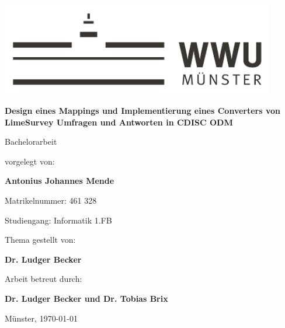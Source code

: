 \begin{centering}
\vspace*{\fill}
\includegraphics[width=12cm]{./img/wwu-logo-neu.pdf}

\vspace{2cm} 

{\Large
	\textbf{Design eines Mappings und Implementierung eines Converters von LimeSurvey Umfragen und Antworten in CDISC ODM}\\[1.2cm]
}

{\large
	Bachelorarbeit\\[2cm]
}

{\large
	vorgelegt von:
}

{ \Large
	\textbf{Antonius Johannes Mende}\\[1cm]
}

{\large
	Matrikelnummer: 461 328\\[2mm]
}

{\large
	Studiengang: Informatik 1.FB\\[1cm]
}
    
{\large
	Thema gestellt von:
}

{\Large
	\textbf{Dr. Ludger Becker}\\[1cm]
}
                               
{\large
	Arbeit betreut durch:
}

{\Large
	\textbf{Dr. Ludger Becker und Dr. Tobias Brix}\\[1cm]
}

{\large
Münster, \today
}
\vfill
\end{centering}
